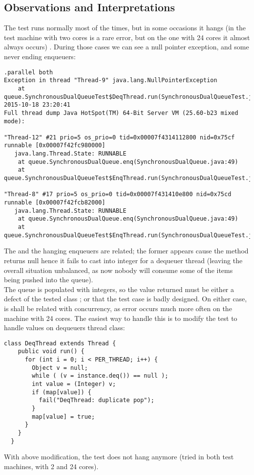 \subsection{Observations and Interpretations}
The test runs normally most of the times, but in some occasions it
hangs (in the test machine with two cores is a rare error, but on the
one with 24 cores it almost always occurs) . During those cases we can
see a null pointer exception, and some never ending enqueuers:

\begin{verbatim}
.parallel both
Exception in thread "Thread-9" java.lang.NullPointerException
	at queue.SynchronousDualQueueTest$DeqThread.run(SynchronousDualQueueTest.java:67)
2015-10-18 23:20:41
Full thread dump Java HotSpot(TM) 64-Bit Server VM (25.60-b23 mixed mode):

"Thread-12" #21 prio=5 os_prio=0 tid=0x00007f4314112800 nid=0x75cf runnable [0x00007f42fc980000]
   java.lang.Thread.State: RUNNABLE
	at queue.SynchronousDualQueue.enq(SynchronousDualQueue.java:49)
	at queue.SynchronousDualQueueTest$EnqThread.run(SynchronousDualQueueTest.java:60)

"Thread-8" #17 prio=5 os_prio=0 tid=0x00007f431410e800 nid=0x75cd runnable [0x00007f42fcb82000]
   java.lang.Thread.State: RUNNABLE
	at queue.SynchronousDualQueue.enq(SynchronousDualQueue.java:49)
	at queue.SynchronousDualQueueTest$EnqThread.run(SynchronousDualQueueTest.java:60)
\end{verbatim}
\hfill

The  and the hanging enqueuers are related;
the former appears cause the  method returns null hence it
fails to cast into integer for a dequeuer thread (leaving the overall
situation unbalanced, as now nobody will consume some of the items
being pushed into the queue). \\

The queue is populated with integers, so the  value returned
must be either a defect of the tested class ;
or that the test case is badly designed. On either case, is shall be
related with concurrency, as error occurs much more often on the machine
with 24 cores. The easiest way to handle this is to modify the test to
handle  values on dequeuers thread class: \\

\begin{lstlisting}[style=nonumbers]
  class DeqThread extends Thread {
    public void run() {
      for (int i = 0; i < PER_THREAD; i++) {
        Object v = null;
        while ( (v = instance.deq()) == null ); 
        int value = (Integer) v;
        if (map[value]) {
          fail("DeqThread: duplicate pop");
        }
        map[value] = true;
      }
    }
  }  
\end{lstlisting}
\hfill

With above modification, the test does not hang anymore (tried in both
test machines, with 2 and 24 cores). 

